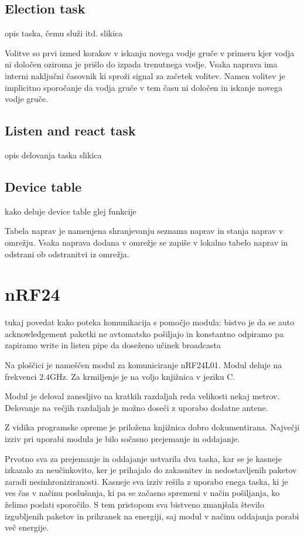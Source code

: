 \documentclass[runningheads]{llncs}
\begin{document}
\subsection{Election task}
opis taska, čemu služi itd. slikica

Volitve so prvi izmed korakov v iskanju novega vodje gruče v primeru kjer vodja ni določen oziroma je prišlo do izpada trenutnega vodje. Vsaka naprava ima interni naključni časovnik ki sproži signal za začetek volitev. Namen volitev je implicitno sporočanje da vodja gruče v tem času ni določen in iskanje novega vodje gruče.
\subsection{Listen and react task}
opis delovanja taska slikica
\subsection{Device table}
kako deluje device table glej funkcije

Tabela naprav je namenjena shranjevanju seznama naprav in stanja naprav v omrežju. Vsaka naprava dodana v omrežje se zapiše v lokalno tabelo naprav in odstrani ob odstranitvi iz omrežja.
\section{nRF24}
tukaj povedat kako poteka komunikacija s pomočjo modula:
bistvo je da se auto acknowledgement paketki ne avtomatsko pošiljajo in konstantno odpiramo pa zapiramo write in listen pipe da doseženo učinek broadcasta

Na ploščici je nameščen modul za komuniciranje nRF24L01. Modul deluje na frekvenci 2.4GHz. Za krmiljenje je na voljo knjižnica v jeziku C.

Modul je deloval zanesljivo na kratkih razdaljah reda velikosti nekaj metrov. Delovanje na večjih razdaljah je možno doseči z uporabo dodatne antene.

Z vidika programske opreme je priložena knjižnica dobro dokumentirana. Največji izziv pri uporabi modula je bilo sočasno prejemanje in oddajanje.

Prvotno sva za prejemanje in oddajanje ustvarila dva taska, kar se je kasneje izkazalo za neučinkovito, ker je prihajalo do zakasnitev in nedostavljenih paketov zaradi nesinhroniziranosti. Kasneje sva izziv rešila z uporabo enega taska, ki je ves čas v načinu poslušanja, ki pa se začasno spremeni v način pošiljanja, ko želimo poslati sporočilo. S tem pristopom sva bistveno zmanjšala število izgubljenih paketov in prihranek na energiji, saj modul v načinu oddajanja porabi več energije.
\end{document}
